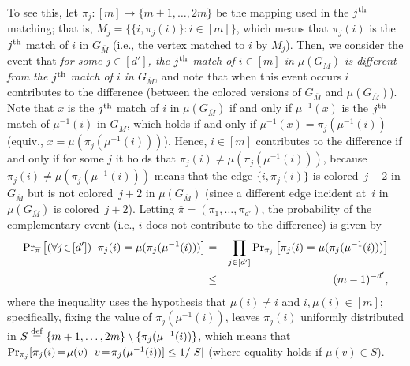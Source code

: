 \documentclass[10pt,a4paper]{article}
\theoremstyle{definition}
\newcommand{\prob}{{\rm Pr}}
\newcommand{\xth}{{\rm th}}
\newcommand{\imu}{{\mu^{-1}}}
\newcommand{\eqdef}{\stackrel{\rm def}{=}}
\newcommand{\ov}{\overline}
\begin{document}
To see this, let $\pi_j:[m]\to\{m+1,\ldots,2m\}$
be the mapping used in the $j^\xth$ matching;
that is, $M_j=\{\{i,\pi_j(i)\}:i\!\in\![m]\}$,
which means that $\pi_j(i)$ is the $j^\xth$ match of $i$ in $G_{\ov M}$
(i.e., the vertex matched to $i$ by $M_j$).
Then, we consider the event that {\em for some $j\in[d']$,
the $j^\xth$ match of $i\in[m]$ in $\mu(G_{\ov M})$
is different from the $j^\xth$ match of $i$ in $G_{\ov M}$},
and note that when this event occurs $i$ contributes to the difference
(between the colored versions of $G_{\ov M}$ and $\mu(G_{\ov M})$).
Note that $x$ is the $j^\xth$ match of $i$ in $\mu(G_{\ov M})$
if and only if $\imu(x)$ is the $j^\xth$ match of $\imu(i)$ in $G_{\ov M}$,
which holds if and only if $\imu(x)=\pi_j(\imu(i))$
(equiv., $x=\mu(\pi_j(\imu(i)))$).
Hence, $i\in[m]$ contributes to the difference if and only if
for some $j$ it holds that $\pi_j(i)\neq\mu(\pi_j(\imu(i)))$,
because $\pi_j(i)\neq\mu(\pi_j(\imu(i)))$ means that
the edge $\{i,\pi_j(i)\}$ is colored~$j+2$ in $G_{\ov M}$
but is not colored~$j+2$ in $\mu(G_{\ov M})$
(since a different edge incident at~$i$ in $\mu(G_{\ov M})$
is colored~$j+2$).
%
%
Letting ${\ov\pi}=(\pi_1,\ldots,\pi_{d'})$,
the probability of the complementary event
(i.e., $i$ does not contribute to the difference)
is given by
\begin{eqnarray*}
\prob_{\ov\pi}
  \left[(\forall j\!\in\![d'])\;\;\pi_j(i)=\mu(\pi_j(\imu(i)))\right]
&=& \prod_{j\in[d']}
    \prob_{\pi_j}\left[\pi_j(i)=\mu(\pi_j(\imu(i)))\right] \\
&\leq& (m-1)^{-d'},
\end{eqnarray*}
where the inequality uses the hypothesis
that $\mu(i)\neq i$ and $i,\mu(i)\!\in\![m]$;
specifically, fixing the value of $\pi_j(\imu(i))$,
leaves $\pi_j(i)$ uniformly distributed
in $S\eqdef\{m+1,\ldots,2m\}\setminus\{\pi_j(\imu(i))\}$,
which means that
$\prob_{\pi_j}[\pi_j(i)\!=\!\mu(v)\,|\,v\!=\!\pi_j(\imu(i))]\leq1/|S|$
(where equality holds if $\mu(v)\in S$).
\end{document}
